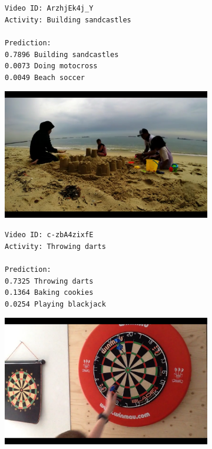 \begin{figure}[H]
\centering
\begin{subfigure}[b]{.4\textwidth}
  \texttt{Video ID: ArzhjEk4j\_Y \\
  Activity: Building sandcastles \\
  \\
  Prediction: \\
  0.7896	Building sandcastles \\
  0.0073	Doing motocross \\
  0.0049	Beach soccer \\}
\end{subfigure}%
\begin{subfigure}[b]{.6\textwidth}
  \centering
\includegraphics[width=0.95\linewidth]{img/results/results_visualization_classification_1}
\end{subfigure}

\begin{subfigure}[b]{.4\textwidth}
  \texttt{Video ID: c-zbA4zixfE \\
  Activity: Throwing darts \\
  \\
  Prediction: \\
  0.7325	Throwing darts \\
  0.1364	Baking cookies \\
  0.0254	Playing blackjack \\}
\end{subfigure}%
\begin{subfigure}[b]{.6\textwidth}
  \centering
\includegraphics[width=0.95\linewidth]{img/results/results_visualization_classification_2}
\end{subfigure}


\end{figure}
